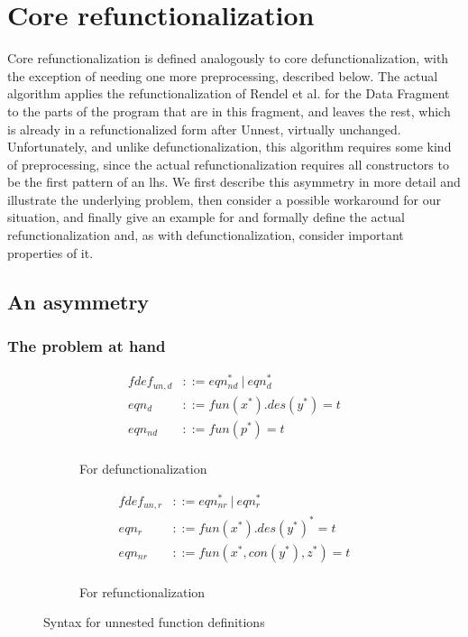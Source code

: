 \section{Core refunctionalization}
\label{sec:corerefunc}

Core refunctionalization is defined analogously to core defunctionalization, with the exception of needing one more preprocessing, described below. The actual algorithm applies the refunctionalization of Rendel et al.\cite{rendel15automatic} for the Data Fragment to the parts of the program that are in this fragment, and leaves the rest, which is already in a refunctionalized form after \textsf{Unnest}, virtually unchanged. Unfortunately, and unlike defunctionalization, this algorithm requires some kind of preprocessing, since the actual refunctionalization requires all constructors to be the first pattern of an lhs. We first describe this asymmetry in more detail and illustrate the underlying problem, then consider a possible workaround for our situation, and finally give an example for and formally define the actual refunctionalization and, as with defunctionalization, consider important properties of it.

\subsection{An asymmetry}

\subsubsection{The problem at hand}
\label{sssec:asym}

\begin{figure}
\begin{subfigure}{0.5\textwidth}
\begin{align*}
fdef_{un,d} &::= eqn_{nd}^* ~ | ~ eqn_d^* \\
eqn_d &::= fun(x^*).des(y^*) = t \\
eqn_{nd} &::= fun(p^*) = t \\
\end{align*}
\caption{For defunctionalization}
\label{fig:unnfddefunc}
\end{subfigure}
\begin{subfigure}{0.5\textwidth}
\begin{align*}
fdef_{un,r} &::= eqn_{nr}^* ~ | ~ eqn_r^* \\
eqn_r &::= fun(x^*).des(y^*)^* = t \\
eqn_{nr} &::= fun(x^*, con(y^*), z^*) = t \\
\end{align*}
\caption{For refunctionalization}
\label{fig:unnfdrefunc}
\end{subfigure}
\caption{Syntax for unnested function definitions}
\end{figure}

